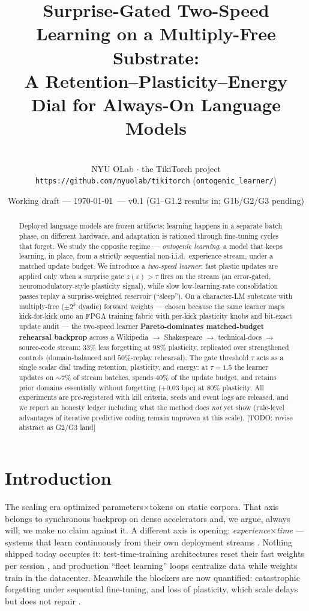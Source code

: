\documentclass[11pt]{article}
\title{Surprise-Gated Two-Speed Learning on a Multiply-Free Substrate:\\
A Retention--Plasticity--Energy Dial for Always-On Language Models}
\author{%
  \todo{author list / affiliation / order}\\
  \small NYU OLab $\cdot$ the TikiTorch project\\
  \small \texttt{https://github.com/nyuolab/tikitorch} (\texttt{ontogenic\_learner/})}
\date{Working draft --- \today\ --- v0.1 (G1--G1.2 results in; G1b/G2/G3 pending)}
\newcommand{\todo}[1]{\textcolor{red!70!black}{[TODO: #1]}}
\begin{document}
\maketitle

\begin{abstract}
Deployed language models are frozen artifacts: learning happens in a separate batch phase, on
different hardware, and adaptation is rationed through fine-tuning cycles that forget. We study
the opposite regime --- \emph{ontogenic learning}: a model that keeps learning, in place, from a
strictly sequential non-i.i.d.\ experience stream, under a matched update budget. We introduce a
\emph{two-speed learner}: fast plastic updates are applied only when a surprise gate
$z(\varepsilon)>\tau$ fires on the stream (an error-gated, neuromodulatory-style plasticity
signal), while slow low-learning-rate consolidation passes replay a surprise-weighted reservoir
(``sleep''). On a character-LM substrate with multiply-free ($\pm2^k$ dyadic) forward weights
--- chosen because the same learner maps kick-for-kick onto an FPGA training fabric with
per-kick plasticity knobs and bit-exact update audit --- the two-speed learner
\textbf{Pareto-dominates matched-budget rehearsal backprop} across a Wikipedia
$\rightarrow$ Shakespeare $\rightarrow$ technical-docs $\rightarrow$ source-code stream:
$33\%$ less forgetting at $98\%$ plasticity, replicated over strengthened controls
(domain-balanced and $50\%$-replay rehearsal). The gate threshold $\tau$ acts as a single
scalar dial trading retention, plasticity, and energy: at $\tau{=}1.5$ the learner updates on
${\sim}7\%$ of stream batches, spends $40\%$ of the update budget, and retains prior domains
essentially without forgetting ($+0.03$ bpc) at $80\%$ plasticity. All experiments are
pre-registered with kill criteria, seeds and event logs are released, and we report an honesty
ledger including what the method does \emph{not} yet show (rule-level advantages of iterative
predictive coding remain unproven at this scale). \todo{revise abstract as G2/G3 land}
\end{abstract}

\section{Introduction}\label{sec:intro}

The scaling era optimized parameters$\times$tokens on static corpora. That axis belongs to
synchronous backprop on dense accelerators and, we argue, always will; we make no claim against
it. A different axis is opening: \emph{experience$\times$time} --- systems that learn
continuously from their own deployment streams
\citep{silver2025era,sutton2024loss}. Nothing shipped today occupies it: test-time-training
architectures reset their fast weights per session \citep{behrouz2025titans}, and production
``fleet learning'' loops centralize data while weights train in the datacenter. Meanwhile the
blockers are now quantified: catastrophic forgetting under sequential fine-tuning, and loss of
plasticity, which scale delays but does not repair \citep{dohare2024loss}.
\end{document}
